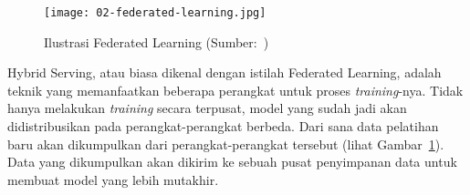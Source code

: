 \begin{figure}[ht]
  \centering
  \texttt{[image: 02-federated-learning.jpg]}
  \caption{Ilustrasi Federated Learning (Sumber:~\cite{book-handsonml})}\label{fig:federated-learning}
\end{figure}

Hybrid Serving, atau biasa dikenal dengan istilah Federated Learning, adalah teknik yang memanfaatkan beberapa perangkat untuk proses \textit{training}-nya.
Tidak hanya melakukan \textit{training} secara terpusat, model yang sudah jadi akan didistribusikan pada perangkat-perangkat berbeda.
Dari sana data pelatihan baru akan dikumpulkan dari perangkat-perangkat tersebut (lihat Gambar~\ref{fig:federated-learning}).
Data yang dikumpulkan akan dikirim ke sebuah pusat penyimpanan data untuk membuat model yang lebih mutakhir.
